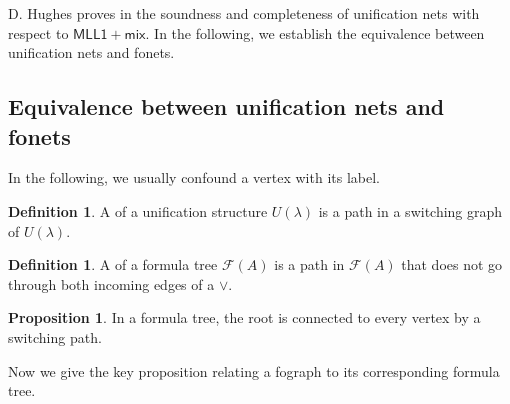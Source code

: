 \documentclass[conference,twosided,10pt]{IEEEtran}
\theoremstyle{definition}
\newtheorem{definition}[thm]{Definition}
\newtheorem{proposition}[thm]{Proposition}
\newcommand*{\FOMLLm}{\mathsf{MLL1+mix}}
\newcommand{\cor}{\vee}
\newcommand{\formtree}[1]{\mathcal{F}(#1)}
\begin{document}
D. Hughes proves in \cite{hughes:unifn} the soundness and completeness of
unification nets with respect to $\FOMLLm$. In the following, we establish the
equivalence between unification nets and fonets.

\subsection{Equivalence between unification nets and fonets}
In the following, we usually confound a vertex with its label. 

\begin{definition} A  of a unification structure $U(\lambda)$ is a path in a switching graph of $U(\lambda)$.
\end{definition}

\begin{definition} A  of a formula tree $\formtree{A}$ is a
	path in $\formtree{A}$ that does not go through both incoming edges of a $\cor$.
\end{definition}

\begin{proposition}
\label{prop1}
In a formula tree, the root is connected to every vertex by a switching path.
\end{proposition}

Now we give the key proposition relating a fograph to its corresponding formula
tree.
\end{document}
